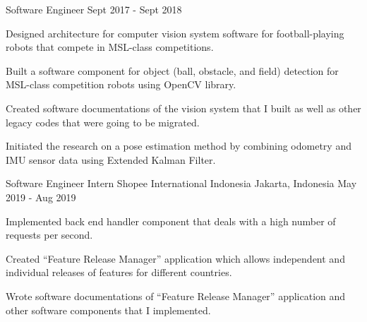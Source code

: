 \begin{cventries}
  \cventry
	{Software Engineer} %
	{} %
	{} %
	{Sept 2017 - Sept 2018} %
	{
	  \begin{cvitems} %
		\item {Designed architecture for computer vision system software for football-playing robots that compete in MSL-class competitions.}
		\item {Built a software component for object (ball, obstacle, and field) detection for MSL-class competition robots using OpenCV library.}
		\item {Created software documentations of the vision system that I built as well as other legacy codes that were going to be migrated.}
        \item {Initiated the research on a pose estimation method by combining odometry and IMU sensor data using Extended Kalman Filter.}
	  \end{cvitems}
	}

\cventry
{Software Engineer Intern} %
{Shopee International Indonesia} %
{Jakarta, Indonesia} %
{May 2019 - Aug 2019} %
{
	\begin{cvitems} %
		\item {Implemented back end handler component that deals with a high number of requests per second.}
		\item {Created ``Feature Release Manager'' application which allows independent and individual releases of features for different countries.}
		\item {Wrote software documentations of ``Feature Release Manager'' application and other software components that I implemented.}
	\end{cvitems}
}



\end{cventries}
